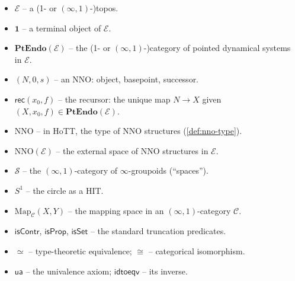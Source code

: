 \documentclass[12pt]{article}
\theoremstyle{definition}
\theoremstyle{remark}
\newcommand{\Map}{\mathrm{Map}}
\newcommand{\PtEndo}{\mathbf{PtEndo}}
\newcommand{\iso}{\cong}
\newcommand{\eqv}{\simeq}
\newcommand{\NNO}{\mathrm{NNO}}
\newcommand{\ua}{\mathsf{ua}}
\newcommand{\idtoeqv}{\mathsf{idtoeqv}}
\newcommand{\Sone}{S^{1}}
\newcommand{\isContr}{\mathsf{isContr}}
\newcommand{\isProp}{\mathsf{isProp}}
\newcommand{\isSet}{\mathsf{isSet}}
\newcommand{\Spc}{\mathcal{S}}
\newcommand{\rec}{\mathsf{rec}}
\begin{document}
\begin{itemize}
  \item $\mathcal{E}$ -- a (1- or $(\infty,1)$-)topos.
  \item $\mathbf{1}$ -- a terminal object of $\mathcal{E}$.
  \item $\PtEndo(\mathcal{E})$ -- the (1- or $(\infty,1)$-)category of pointed dynamical systems in $\mathcal{E}$.
  \item $(N,0,s)$ -- an NNO\@: object, basepoint, successor.
  \item $\rec(x_{0},f)$ -- the recursor: the unique map $N\to X$ given $(X,x_{0},f)\in\PtEndo(\mathcal{E})$.
  \item $\NNO$ -- in HoTT, the type of NNO structures (\cref{def:nno-type}).
  \item $\mathrm{NNO}(\mathcal{E})$ -- the external space of NNO structures in $\mathcal{E}$.
  \item $\Spc$ -- the $(\infty,1)$-category of $\infty$-groupoids (``spaces'').
  \item $\Sone$ -- the circle as a HIT.
  \item $\Map_{\mathcal{C}}(X,Y)$ -- the mapping space in an $(\infty,1)$-category $\mathcal{C}$.
  \item $\isContr$, $\isProp$, $\isSet$ -- the standard truncation predicates.
  \item $\eqv$ -- type-theoretic equivalence; $\iso$ -- categorical isomorphism.
  \item $\ua$ -- the univalence axiom; $\idtoeqv$ -- its inverse.
\end{itemize}
\end{document}
